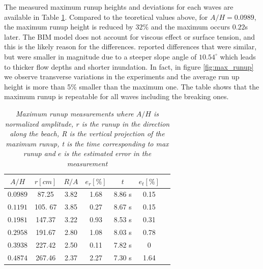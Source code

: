\documentclass[review]{elsarticle}
\begin{document}
The measured maximum runup heights and deviations for each waves are available in Table \ref{tab:max_shore}. Compared to the teoretical values above, for $A/H=0.0989$,  the maximum runup height is reduced by $32$\% and the maximum occurs $0.22$s later.  The BIM model does not account for viscous effect or surface tension, and this is the likely reason for the differences. \cite{pedersen2013runup} reported differences that were similar, but were smaller in magnitude due to a steeper 
slope angle of $10.54 ^\circ$ which leads to thicker flow depths and shorter inundation. In fact, in figure \ref{fig:max_runup} we observe transverse variations in the experiments and the average
run up height is more than 5\% smaller than the maximum one.  The table shows that the maximum runup is repeatable for all waves including the breaking ones. %
\begin{table}[]
\caption{\textit{Maximum runup measurements where $A/H$ is normalized amplitude, $r$ is the runup in the direction along the beach, R is the vertical projection of the maximum runup, t is the time corresponding to max runup and $e$ is the estimated error in the measurement }}
\centering
\begin{tabular}{ccccccc}
\hline
         $A/H$&  $r [cm]$ &$R/A$ & $e_r [\%]$ & $t$ & $e_t [\%]$ \\ \hline
\textit{$0.0989$}  & 87.25    &    3.82  & 1.68             & 8.86 s        & 0.15               \\
\textit{$0.1191$}  & 105. 67   &    3.85   & 0.27             & 8.67 s        & 0.15               \\
\textit{$0.1981$} & 147.37    &    3.22  & 0.93            & 8.53 s        & 0.31                \\
\textit{$0.2958$}  & 191.67     &   2.80  & 1.08           & 8.03 s        & 0.78              \\
\textit{$0.3938$}  & 227.42      &   2.50 & 0.11            & 7.82 s        & 0              \\
\textit{$0.4874$}  & 267.46       &    2.37 & 2.27            & 7.30 s        & 1.64              
\end{tabular}
\label{tab:max_shore}
\end{table}
\end{document}
